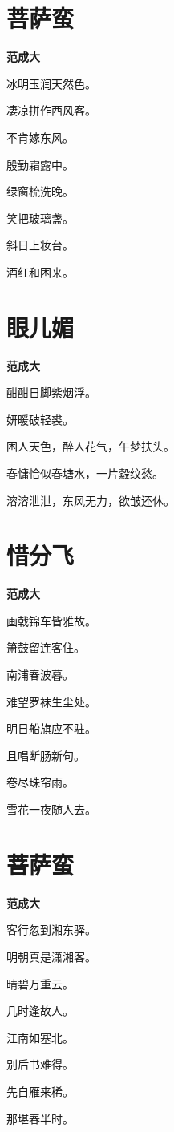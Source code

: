 \documentclass[12pt,a4paper]{ctexbook}
\begin{document}
\section{菩萨蛮}
\textbf{范成大}\par\vspace{0.5em}
冰明玉润天然色。\par
凄凉拼作西风客。\par
不肯嫁东风。\par
殷勤霜露中。\par
绿窗梳洗晚。\par
笑把玻璃盏。\par
斜日上妆台。\par
酒红和困来。\par

\section{眼儿媚}
\textbf{范成大}\par\vspace{0.5em}
酣酣日脚紫烟浮。\par
妍暖破轻裘。\par
困人天色，醉人花气，午梦扶头。\par
春慵恰似春塘水，一片縠纹愁。\par
溶溶泄泄，东风无力，欲皱还休。\par

\section{惜分飞}
\textbf{范成大}\par\vspace{0.5em}
画戟锦车皆雅故。\par
箫鼓留连客住。\par
南浦春波暮。\par
难望罗袜生尘处。\par
明日船旗应不驻。\par
且唱断肠新句。\par
卷尽珠帘雨。\par
雪花一夜随人去。\par

\section{菩萨蛮}
\textbf{范成大}\par\vspace{0.5em}
客行忽到湘东驿。\par
明朝真是潇湘客。\par
晴碧万重云。\par
几时逢故人。\par
江南如塞北。\par
别后书难得。\par
先自雁来稀。\par
那堪春半时。\par
\end{document}
